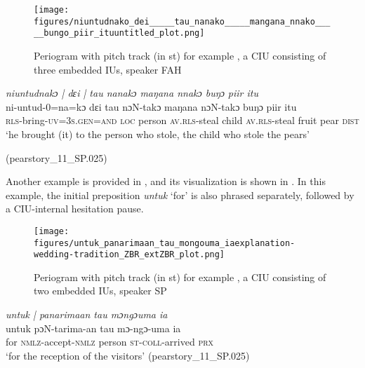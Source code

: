 \begin{figure}
	\texttt{[image: figures/niuntudnako\_dei\_\_\_\_\_tau\_nanako\_\_\_\_\_mangana\_nnako\_\_\_\_\_bungo\_piir\_ituuntitled\_plot.png]}
	\caption{Periogram with pitch track (in st) for example , a CIU consisting of three embedded IUs, speaker FAH}
	\label{pitch:niuntudnako dɛi (.) tau nanako (.) mangana nnako (.) bungo piir itu}
\end{figure}






\ea
\label{ex:niuntudnako dɛi (.) tau nanako (.) mangana nnako (.) bungo piir itu}
\textit{niuntudnakɔ | dɛi | tau nanakɔ maŋana nnakɔ  buŋɔ piir itu} \\
\gll ni-untud-0=na=kɔ dɛi  tau nɔN-takɔ  maŋana nɔN-takɔ  buŋɔ piir itu \\
\textsc{rls}-bring-\textsc{uv=3s.gen=and} \textsc{loc}  person \textsc{av.rls-}steal  child \textsc{av.rls-}steal  fruit pear \textsc{dist}\\
\glt ‘he brought (it) to the person who stole, the child who stole the pears’ \begin{flushright}(pearstory\_11\_SP.025)	
	\end{flushright}
\z




Another example is provided in  , and its visualization is shown in  . In this example, the initial preposition \textit{untuk}  `for' is also phrased separately, followed by a CIU-internal hesitation pause.

\begin{figure}
	\texttt{[image: figures/untuk\_panarimaan\_tau\_mongouma\_iaexplanation-wedding-tradition\_ZBR\_extZBR\_plot.png]}
	\caption{Periogram with pitch track (in st) for example , a CIU consisting of two embedded IUs, speaker SP}
	\label{pitch:untuk panarimaan tau mongouma ia}
\end{figure}

\ea
\label{ex:untuk panarimaan tau mongouma ia}
\textit{untuk | panarimaan tau mɔngɔuma ia} \\
\gll untuk pɔN-tarima-an tau mɔ-ngɔ-uma ia \\
for \textsc{nmlz}-accept\textsc{-nmlz} person \textsc{st-coll-}arrived \textsc{prx}\\
\glt ‘for the reception of the visitors’ \hfill(pearstory\_11\_SP.025)
\z







